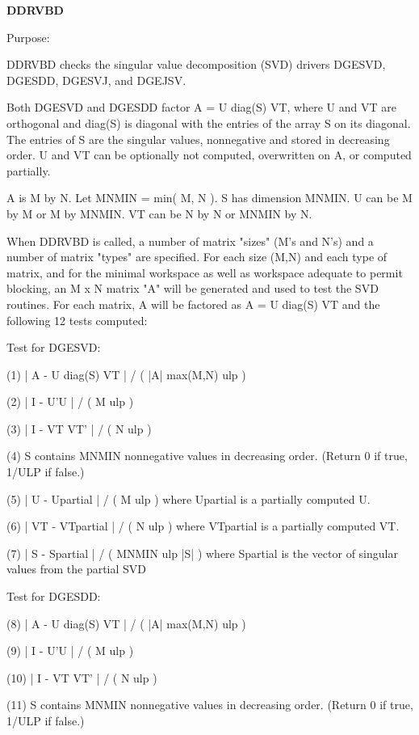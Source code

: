{\bfseries D\+D\+R\+V\+B\+D} 

\begin{DoxyParagraph}{Purpose\+: }
\begin{DoxyVerb} DDRVBD checks the singular value decomposition (SVD) drivers
 DGESVD, DGESDD, DGESVJ, and DGEJSV.

 Both DGESVD and DGESDD factor A = U diag(S) VT, where U and VT are
 orthogonal and diag(S) is diagonal with the entries of the array S
 on its diagonal. The entries of S are the singular values,
 nonnegative and stored in decreasing order.  U and VT can be
 optionally not computed, overwritten on A, or computed partially.

 A is M by N. Let MNMIN = min( M, N ). S has dimension MNMIN.
 U can be M by M or M by MNMIN. VT can be N by N or MNMIN by N.

 When DDRVBD is called, a number of matrix "sizes" (M's and N's)
 and a number of matrix "types" are specified.  For each size (M,N)
 and each type of matrix, and for the minimal workspace as well as
 workspace adequate to permit blocking, an  M x N  matrix "A" will be
 generated and used to test the SVD routines.  For each matrix, A will
 be factored as A = U diag(S) VT and the following 12 tests computed:

 Test for DGESVD:

 (1)    | A - U diag(S) VT | / ( |A| max(M,N) ulp )

 (2)    | I - U'U | / ( M ulp )

 (3)    | I - VT VT' | / ( N ulp )

 (4)    S contains MNMIN nonnegative values in decreasing order.
        (Return 0 if true, 1/ULP if false.)

 (5)    | U - Upartial | / ( M ulp ) where Upartial is a partially
        computed U.

 (6)    | VT - VTpartial | / ( N ulp ) where VTpartial is a partially
        computed VT.

 (7)    | S - Spartial | / ( MNMIN ulp |S| ) where Spartial is the
        vector of singular values from the partial SVD

 Test for DGESDD:

 (8)    | A - U diag(S) VT | / ( |A| max(M,N) ulp )

 (9)    | I - U'U | / ( M ulp )

 (10)   | I - VT VT' | / ( N ulp )

 (11)   S contains MNMIN nonnegative values in decreasing order.
        (Return 0 if true, 1/ULP if false.)


\end{DoxyVerb}
\end{DoxyParagraph}

